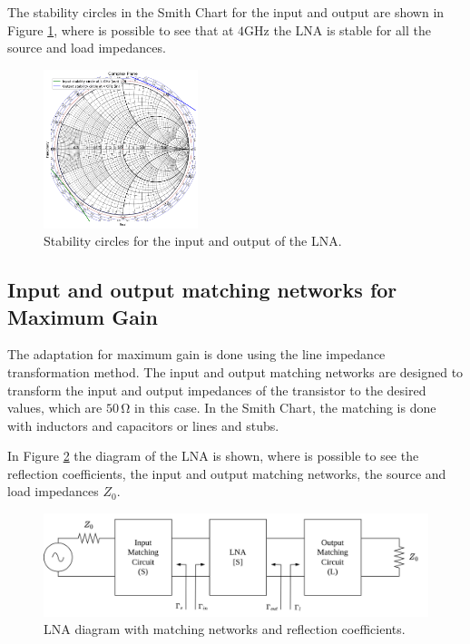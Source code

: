 The stability circles in the Smith Chart for the input and output are shown in Figure \ref{fig:StabilityCircles}, where is possible to see  that at $4\si{\giga\hertz}$ the LNA is stable for all the source and load impedances.

\begin{figure}[H]
    \centering
    \includegraphics[width=0.4\textwidth]{Images/stability-circles.png}
    \caption{Stability circles for the input and output of the LNA.}
    \label{fig:StabilityCircles}
\end{figure}

\subsection{Input and output matching networks for Maximum Gain}

The adaptation for maximum gain is done using the line impedance transformation method. The input and output matching networks are designed to transform the input and output impedances of the transistor to the desired values, which are $50\,\si{\ohm}$ in this case. In the Smith Chart, the matching is done with inductors and capacitors or lines and stubs.

In Figure \ref{fig:LNA-diagram} the diagram of the LNA is shown, where is possible to see the reflection coefficients, the input and output matching networks, the source and load impedances $Z_0$.

\begin{figure}[H]
    \centering
    \includegraphics[width=1\textwidth]{Images/LNA-diagram.png}
    \caption{LNA diagram with matching networks and reflection coefficients.}
    \label{fig:LNA-diagram}
\end{figure}

